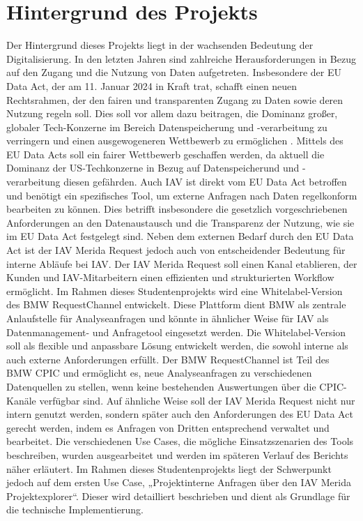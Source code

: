 \section{Hintergrund des Projekts}
Der Hintergrund dieses Projekts liegt in der wachsenden Bedeutung der Digitalisierung. In den letzten Jahren sind zahlreiche Herausforderungen in Bezug auf den Zugang und die Nutzung von Daten aufgetreten. Insbesondere der EU Data Act, der am 11. Januar 2024 in Kraft trat, schafft einen neuen Rechtsrahmen, der den fairen und transparenten Zugang zu Daten sowie deren Nutzung regeln soll. Dies soll vor allem dazu beitragen, die Dominanz großer, globaler Tech-Konzerne im Bereich Datenspeicherung und -verarbeitung zu verringern und einen ausgewogeneren Wettbewerb zu ermöglichen .\cite{EUData_JohnerInstitut,bmdv2024}
\newline
Mittels des EU Data Acts soll ein fairer Wettbewerb geschaffen werden, da aktuell die Dominanz der US-Techkonzerne in Bezug auf Datenspeicherund und -verarbeitung diesen gefährden. \cite{EUData_JohnerInstitut}
\newline
Auch IAV ist direkt vom EU Data Act betroffen und benötigt ein spezifisches Tool, um externe Anfragen nach Daten regelkonform bearbeiten zu können. Dies betrifft insbesondere die gesetzlich vorgeschriebenen Anforderungen an den Datenaustausch und die Transparenz der Nutzung, wie sie im EU Data Act festgelegt sind.
\newline
Neben dem externen Bedarf durch den EU Data Act ist der IAV Merida Request jedoch auch von entscheidender Bedeutung für interne Abläufe bei IAV. Der IAV Merida Request soll einen Kanal etablieren, der Kunden und IAV-Mitarbeitern einen effizienten und strukturierten Workflow ermöglicht.
\newline
\newline
Im Rahmen dieses Studentenprojekts wird eine Whitelabel-Version des BMW RequestChannel entwickelt. Diese Plattform dient BMW als zentrale Anlaufstelle für Analyseanfragen und könnte in ähnlicher Weise für IAV als Datenmanagement- und Anfragetool eingesetzt werden. Die Whitelabel-Version soll als flexible und anpassbare Lösung entwickelt werden, die sowohl interne als auch externe Anforderungen erfüllt.
\newline
Der BMW RequestChannel ist Teil des BMW \ac{CPIC} und ermöglicht es, neue Analyseanfragen zu verschiedenen Datenquellen zu stellen, wenn keine bestehenden Auswertungen über die \ac{CPIC}-Kanäle verfügbar sind. Auf ähnliche Weise soll der IAV Merida Request nicht nur intern genutzt werden, sondern später auch den Anforderungen des EU Data Act gerecht werden, indem es Anfragen von Dritten entsprechend verwaltet und bearbeitet. 
\newline
Die verschiedenen Use Cases, die mögliche Einsatzszenarien des Tools beschreiben, wurden ausgearbeitet und werden im späteren Verlauf des Berichts näher erläutert. Im Rahmen dieses Studentenprojekts liegt der Schwerpunkt jedoch auf dem ersten Use Case, „Projektinterne Anfragen über den IAV Merida Projektexplorer“. Dieser wird detailliert beschrieben und dient als Grundlage für die technische Implementierung.
